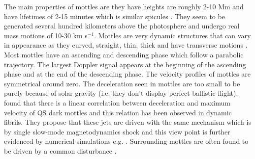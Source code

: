\documentclass[12pt]{ociamthesis}
\begin{document}
\par The main properties of mottles are they have heights are roughly 2-10 Mm and have lifetimes of 2-15 minutes which is similar spicules  \citep{Suematsu1995ApJ}. They seem to be generated several hundred kilometers above the photosphere and undergo real mass motions of 10-30 km s$^{-1}$. Mottles are very dynamic structures that can vary in appearance as they curved, straight, thin, thick and have transverse motions \citep{De_Pontieu2007ApJ}. Most mottles have an ascending and descending phase which follow a parabolic trajectory. The largest Doppler signal appears at the beginning of the ascending phase and at the end of the descending phase. The velocity profiles of mottles are symmetrical around zero. The deceleration seen in mottles are too small to be purely because of solar gravity (i.e. they don't display perfect ballistic flight). \cite{Rouppe2007ApJ660L169R} found that there is a linear correlation between deceleration and maximum velocity of QS dark mottles and this relation has been observed in dynamic fibrils. They propose that these jets are driven with the same mechanism which is by single slow-mode magnetodynamics shock and this view point is further evidenced by numerical simulations e.g. \citep{De_Pontieu2007ApJ, Hansteen2006ApJ}. Surrounding mottles are often found to be driven by a common disturbance \cite{De_Pontieu2007ApJ}.
\end{document}
